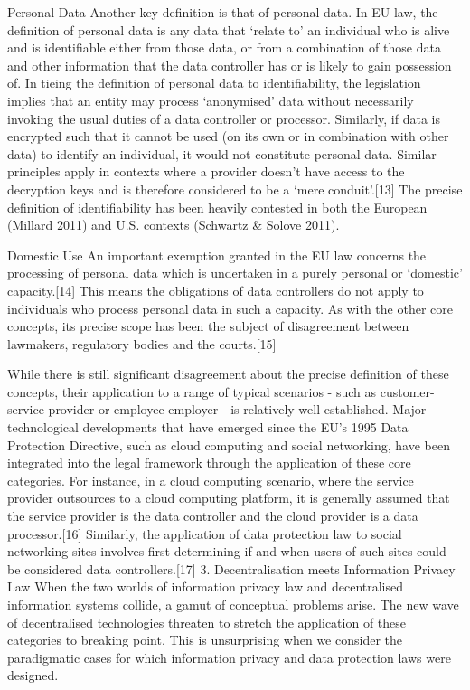 \documentclass{acm_proc_article-sp}
\begin{document}
Personal Data
Another key definition is that of personal data. In EU law, the definition of personal data is any data that ‘relate to’ an individual who is alive and is identifiable either from those data, or from a combination of those data and other information that the data controller has or is likely to gain possession of. In tieing the definition of personal data to identifiability, the legislation implies that an entity may process ‘anonymised’ data without necessarily invoking the usual duties of a data controller or processor. Similarly, if data is encrypted such that it cannot be used (on its own or in combination with other data) to identify an individual, it would not constitute personal data. Similar principles apply in contexts where a provider doesn’t have access to the decryption keys and is therefore considered to be a ‘mere conduit’.[13] The precise definition of identifiability has been heavily contested in both the European (Millard 2011) and U.S. contexts (Schwartz & Solove 2011).
 
Domestic Use
An important exemption granted in the EU law concerns the processing of personal data which is undertaken in a purely personal or ‘domestic’ capacity.[14] This means the obligations of data controllers do not apply to individuals who process personal data in such a capacity. As with the other core concepts, its precise scope has been the subject of disagreement between lawmakers, regulatory bodies and the courts.[15]
 
While there is still significant disagreement about the precise definition of these concepts, their application to a range of typical scenarios - such as customer-service provider or employee-employer - is relatively well established. Major technological developments that have emerged since the EU’s 1995 Data Protection Directive, such as cloud computing and social networking, have been integrated into the legal framework through the application of these core categories. For instance, in a cloud computing scenario, where the service provider outsources to a cloud computing platform, it is generally assumed that the service provider is the data controller and the cloud provider is a data processor.[16] Similarly, the application of data protection law to social networking sites involves first determining if and when users of such sites could be considered data controllers.[17]
3. Decentralisation meets Information Privacy Law
When the two worlds of information privacy law and decentralised information systems collide, a gamut of conceptual problems arise. The new wave of decentralised technologies threaten to stretch the application of these categories to breaking point. This is unsurprising when we consider the paradigmatic cases for which information privacy and data protection laws were designed.
 
\end{document}
